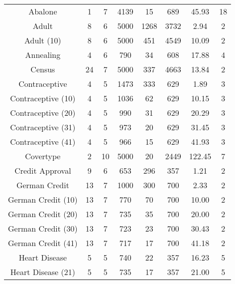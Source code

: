\begin{longtable}{cccccccc}
\bottomrule
\endlastfoot
           Abalone &       1 &           7 &  4139 &         15 &        689 &  45.93 &       18 \\
             Adult &       8 &           6 &  5000 &       1268 &       3732 &   2.94 &        2 \\
        Adult (10) &       8 &           6 &  5000 &        451 &       4549 &  10.09 &        2 \\
         Annealing &       4 &           6 &   790 &         34 &        608 &  17.88 &        4 \\
            Census &      24 &           7 &  5000 &        337 &       4663 &  13.84 &        2 \\
     Contraceptive &       4 &           5 &  1473 &        333 &        629 &   1.89 &        3 \\
Contraceptive (10) &       4 &           5 &  1036 &         62 &        629 &  10.15 &        3 \\
Contraceptive (20) &       4 &           5 &   990 &         31 &        629 &  20.29 &        3 \\
Contraceptive (31) &       4 &           5 &   973 &         20 &        629 &  31.45 &        3 \\
Contraceptive (41) &       4 &           5 &   966 &         15 &        629 &  41.93 &        3 \\
         Covertype &       2 &          10 &  5000 &         20 &       2449 & 122.45 &        7 \\
   Credit Approval &       9 &           6 &   653 &        296 &        357 &   1.21 &        2 \\
     German Credit &      13 &           7 &  1000 &        300 &        700 &   2.33 &        2 \\
German Credit (10) &      13 &           7 &   770 &         70 &        700 &  10.00 &        2 \\
German Credit (20) &      13 &           7 &   735 &         35 &        700 &  20.00 &        2 \\
German Credit (30) &      13 &           7 &   723 &         23 &        700 &  30.43 &        2 \\
German Credit (41) &      13 &           7 &   717 &         17 &        700 &  41.18 &        2 \\
     Heart Disease &       5 &           5 &   740 &         22 &        357 &  16.23 &        5 \\
Heart Disease (21) &       5 &           5 &   735 &         17 &        357 &  21.00 &        5 \\

\end{longtable}
